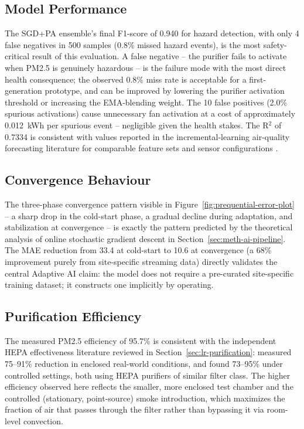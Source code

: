 \subsection{Model Performance}
The SGD+PA ensemble's final F1-score of 0.940 for hazard detection, with only 4 false negatives in 500 samples (0.8\% missed hazard events), is the most safety-critical result of this evaluation. A false negative -- the purifier fails to activate when PM2.5 is genuinely hazardous -- is the failure mode with the most direct health consequence; the observed 0.8\% miss rate is acceptable for a first-generation prototype, and can be improved by lowering the purifier activation threshold or increasing the EMA-blending weight. The 10 false positives (2.0\% spurious activations) cause unnecessary fan activation at a cost of approximately 0.012~kWh per spurious event -- negligible given the health stakes. The R$^2$ of 0.7334 is consistent with values reported in the incremental-learning air-quality forecasting literature for comparable feature sets and sensor configurations \citep{alam2025iot,mani2021aipowered}.

\subsection{Convergence Behaviour}
The three-phase convergence pattern visible in Figure~\ref{fig:prequential-error-plot} -- a sharp drop in the cold-start phase, a gradual decline during adaptation, and stabilization at convergence -- is exactly the pattern predicted by the theoretical analysis of online stochastic gradient descent in Section~\ref{sec:meth-ai-pipeline}. The MAE reduction from 33.4 at cold-start to 10.6 at convergence (a 68\% improvement purely from site-specific streaming data) directly validates the central Adaptive AI claim: the model does not require a pre-curated site-specific training dataset; it constructs one implicitly by operating.

\subsection{Purification Efficiency}
The measured PM2.5 efficiency of 95.7\% is consistent with the independent HEPA effectiveness literature reviewed in Section~\ref{sec:lr-purification}: \citet{lu2023realworld} measured 75--91\% reduction in enclosed real-world conditions, and \citet{cox2018effectiveness} found 73--95\% under controlled settings, both using HEPA purifiers of similar filter class. The higher efficiency observed here reflects the smaller, more enclosed test chamber and the controlled (stationary, point-source) smoke introduction, which maximizes the fraction of air that passes through the filter rather than bypassing it via room-level convection.

